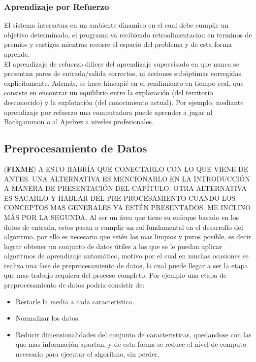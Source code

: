 \documentclass[a4paper,11pt,spanish]{book}
\newcommand*{\FIXME}[1]{{(\textbf{FIXME}) {#1}}}
\begin{document}
      \subsubsection{Aprendizaje por Refuerzo}
	El sistema interactua en un ambiente dinamico en el cual debe cumplir un objetivo determinado, el programa va recibiendo retroalimentacion en terminos de premios y castigos mientras
	recorre el espacio del problema y de esta forma aprende.\\
	El aprendizaje de refuerzo difiere del aprendizaje supervisado en que nunca se presentan pares de entrada/salida correctos, ni acciones subóptimas corregidas explícitamente.
	Además, se hace hincapié en el rendimiento en tiempo real, que consiste en encontrar un equilibrio entre la exploración (del territorio desconocido) y la explotación
	(del conocimiento actual).
	Por ejemplo, mediante aprendizaje por refuerzo una computadora puede aprender a jugar al Backgammon o al Ajedrez a niveles profesionales.
\iffalse
        \subsection{Preprocesamiento de Datos}
        \FIXME{A ESTO HABRÍA QUE CONECTARLO CON LO QUE VIENE DE ANTES. UNA
          ALTERNATIVA ES MENCIONARLO EN LA INTRODUCCIÓN A MANERA DE PRESENTACIÓN
        DEL CAPÍTULO. OTRA ALTERNATIVA ES SACARLO Y HABLAR DEL PRE-PROCESAMIENTO
        CUANDO LOS CONCEPTOS MAS GENERALES YA ESTÉN PRESENTADOS. ME INCLINO MÁS
        POR LA SEGUNDA.}
      Al ser un área que tiene su enfoque basado en los datos de entrada, estos pasan a cumplir un rol fundamental en el desarrollo del algoritmo, por ello es necesario que
      estén los mas limpios y puros posible, es decir lograr obtener un conjunto de datos útiles a los que se le puedan aplicar algoritmos de aprendizaje automático,
      motivo por el cual en muchas ocasiones se realiza una fase de preprocesamiento de datos, la cual puede llegar a ser la etapa que mas trabajo requiera del proceso completo.
      Por ejemplo una etapa de preprocesamiento de datos podria consistir de:
      \begin{itemize}
       \item Restarle la media a cada caracteristica.
       \item Normalizar los datos.
       \item Reducir dimensionalidades del conjunto de caracteristicas, quedandose con las que mas información aportan, y de esta forma se reduce el nivel de computo necesario para
	ejecutar el algoritmo, sin perder.
      \end{itemize}
\end{document}
